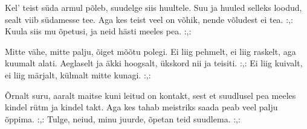 Kel' teist s\"uda armul p\~oleb,
suudelge siis huultele.
Suu ja huuled selleks loodud,
sealt viib s\"udamesse tee.
Aga kes teist veel on v\~ohik,
nende v\~oludest ei tea.
:,: Kuula siis mu \~opetusi,
    ja neid h\"asti meeles pea. :,: 

Mitte v\"ahe, mitte palju,
\~oiget m\~o\~otu polegi.
Ei liig pehmelt, ei liig raskelt,
aga kuumalt alati.
Aeglaselt ja \"akki hoogsalt,
\"ukskord nii ja teisiti.
:,: Ei liig kuivalt, ei liig m\"arjalt,
    k\"ulmalt mitte kunagi. :,: 

\clearpage \~Ornalt suru, aaralt maitse
kuni leitud on kontakt,
sest et suudlusel pea meeles
kindel r\"utm ja kindel takt.
Aga kes tahab meistriks saada
peab veel palju \~oppima.
:,: Tulge, neiud, minu juurde,
    \~opetan teid suudlema. :,: 